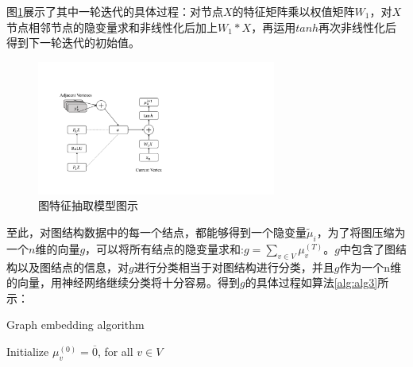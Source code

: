 图\ref{fig:model}展示了其中一轮迭代的具体过程：对节点$X$的特征矩阵乘以权值矩阵$W_1$，对$X$节点相邻节点的隐变量求和非线性化后加上$W_1*X$，再运用$tanh$再次非线性化后得到下一轮迭代的初始值。
\begin{figure}[htbp]
	\begin{center}
		\includegraphics[width=0.7\textwidth]{figures//5.pdf}
		\caption{图特征抽取模型图示}
		\label{fig:model}
	\end{center}
\end{figure}

至此，对图结构数据中的每一个结点，都能够得到一个隐变量$\tilde{\mu}_i$，为了将图压缩为一个$n$维的向量$g$，可以将所有结点的隐变量求和:$g =\sum_{v\in V} \mu_v^{(T)}$。$g$中包含了图结构以及图结点的信息，对$g$进行分类相当于对图结构进行分类，并且$g$作为一个n维的向量，用神经网络继续分类将十分容易。得到$g$的具体过程如算法\ref{alg:alg3}所示：
\begin{algorithm}%
	\caption{Graph embedding algorithm}  
	Initialize $\mu_v^{(0)} = \overline{0}$, for all $v \in V$\\
	\label{alg:alg3}
\end{algorithm}
  
